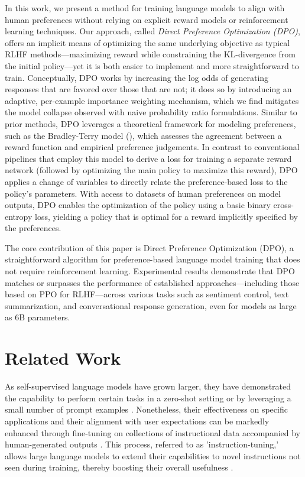 In this work, we present a method for training language models to align with human preferences without relying on explicit reward models or reinforcement learning techniques. Our approach, called \textit{{Direct Preference Optimization} (DPO)}, offers an implicit means of optimizing the same underlying objective as typical RLHF methods—maximizing reward while constraining the KL-divergence from the initial policy—yet it is both easier to implement and more straightforward to train. Conceptually, DPO works by increasing the log odds of generating responses that are favored over those that are not; it does so by introducing an adaptive, per-example importance weighting mechanism, which we find mitigates the model collapse observed with naive probability ratio formulations. Similar to prior methods, DPO leverages a theoretical framework for modeling preferences, such as the Bradley-Terry model (\cite{bradley1952rankanalysis}), which assesses the agreement between a reward function and empirical preference judgements. In contrast to conventional pipelines that employ this model to derive a loss for training a separate reward network (followed by optimizing the main policy to maximize this reward), DPO applies a change of variables to directly relate the preference-based loss to the policy’s parameters. With access to datasets of human preferences on model outputs, DPO enables the optimization of the policy using a basic binary cross-entropy loss, yielding a policy that is optimal for a reward implicitly specified by the preferences.

The core contribution of this paper is Direct Preference Optimization (DPO), a straightforward algorithm for preference-based language model training that does not require reinforcement learning. Experimental results demonstrate that DPO matches or surpasses the performance of established approaches—including those based on PPO for RLHF—across various tasks such as sentiment control, text summarization, and conversational response generation, even for models as large as 6B parameters.

\section{Related Work}

As self-supervised language models have grown larger, they have demonstrated the capability to perform certain tasks in a zero-shot setting \citep{radford2019language} or by leveraging a small number of prompt examples \citep{gpt3,megatron,chowdhery2022palm}. Nonetheless, their effectiveness on specific applications and their alignment with user expectations can be markedly enhanced through fine-tuning on collections of instructional data accompanied by human-generated outputs \citep{mishra-etal-2022-cross,sanh2022multitask,chung2022scaling,thoppilan2022lamda}. This process, referred to as 'instruction-tuning,' allows large language models to extend their capabilities to novel instructions not seen during training, thereby boosting their overall usefulness \citep{chung2022scaling}. 

